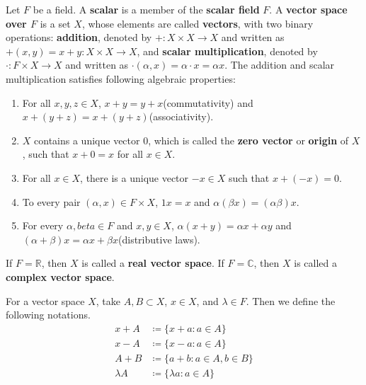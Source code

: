 \begin{defn} Let $F$ be a field. A \textbf{scalar} is a member of the \textbf{scalar field} $F$. A \textbf{vector space over $F$} is a set $X$, whose elements are called \textbf{vectors}, with two binary operations: \textbf{addition}, denoted by $+:X\times X\rightarrow X$ and written as $+(x,y)=x+y:X\times X\rightarrow X$, and \textbf{scalar multiplication}, denoted by $\cdot:F\times X\rightarrow X$ and written as $\cdot(\alpha,x)=\alpha\cdot x=\alpha x$. The addition and scalar multiplication satisfies following algebraic properties:
\begin{enumerate}
\item For all $x,y,z\in X$, $x+y=y+x$(commutativity) and $x+(y+z)=x+(y+z)$(associativity).
\item $X$ contains a unique vector $0$, which is called the \textbf{zero vector} or \textbf{origin} of $X$, such that $x+0=x$ for all $x\in X$.
\item For all $x\in X$, there is a unique vector $-x\in X$ such that $x+(-x)=0$.
\item To every pair $(\alpha,x)\in F\times X$, $1x=x$ and $\alpha(\beta x)=(\alpha \beta)x$.
\item For every $\alpha,beta\in F$ and $x,y\in X$, $\alpha(x+y)=\alpha x+\alpha y$ and $(\alpha+\beta) x=\alpha x + \beta x$(distributive laws).
\end{enumerate}
If $F=\mathbb{R}$, then $X$ is called a \textbf{real vector space}. If $F=\mathbb{C}$, then $X$ is called a \textbf{complex vector space}.
\end{defn}

\begin{defn} For a vector space $X$, take $A,B\subset X$, $x\in X$, and $\lambda\in F$. Then we define the following notations.
\begin{align*}
x+A&\coloneqq\{x+a:a\in A\}\\
x-A&\coloneqq\{x-a:a\in A\}\\
A+B&\coloneqq\{a+b:a\in A,b\in B\}\\
\lambda A&\coloneqq\{\lambda a:a\in A\}
\end{align*}
\end{defn}

